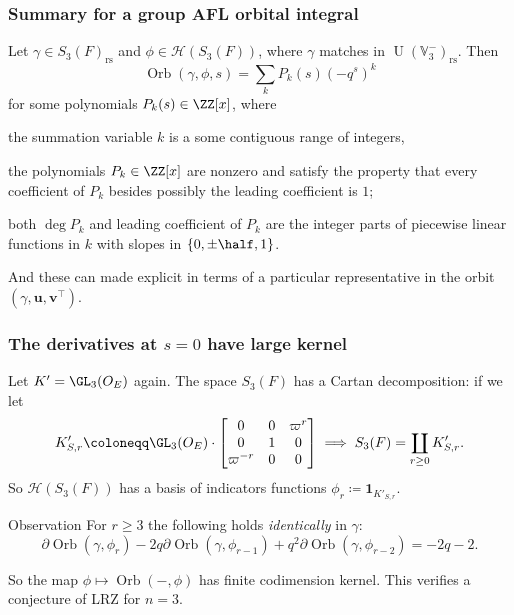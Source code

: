 \documentclass[11pt]{beamer}
\DeclareMathOperator{\Orb}{Orb}
\DeclareMathOperator{\U}{U}
\newcommand{\HH}{\mathcal{H}}
\newcommand{\VV}{\mathbb{V}}
\renewcommand{\OO}{O}
\newcommand{\guv}{{(\gamma, \uu, \vv^\top)}}
\newcommand{\rs}{_{\text{rs}}}
\newcommand{\uu}{\mathbf{u}}
\newcommand{\vv}{\mathbf{v}}
\begin{document}
\begin{frame}
  \frametitle{Summary for a group AFL orbital integral}
  \begin{theorem}[C.]
    Let $\gamma \in S_3(F)\rs$ and $\phi \in \HH(S_3(F))$,
    where $\gamma$ matches in $\U(\VV_3^-)\rs$.
    Then
    \[ \Orb(\gamma, \phi, s) = \sum_k P_k(s) (-q^s)^k \]
    for some polynomials $P_k(s) \in \ZZ[x]$, where
    \begin{itemize}
      \ii the summation variable $k$ is a some contiguous range of integers,

      \ii the polynomials $P_k \in \ZZ[x]$ are nonzero and satisfy the property
      that every coefficient of $P_k$ besides possibly the leading coefficient is $1$;

      \ii both $\deg P_k$ and leading coefficient of $P_k$ are the integer parts
      of piecewise linear functions in $k$ with slopes in $\{0, \pm\half, 1\}$.
    \end{itemize}
    And these can made explicit in terms of a particular representative in the orbit $\guv$.
  \end{theorem}
\end{frame}

\begin{frame}
  \frametitle{The derivatives at $s = 0$ have large kernel}
  \begin{itemize}
    \ii Let $K' = \GL_3(\OO_E)$ again.
    \ii The space $S_3(F)$ has a \alert{Cartan decomposition}: if we let
    \[ K'_{S,r} \coloneqq \GL_3(\OO_E) \cdot \begin{bmatrix} 0 & 0 & \varpi^r \\ 0 & 1 & 0 \\ \varpi^{-r} & 0 & 0 \end{bmatrix}
      \implies S_3(F) = \coprod_{r \geq 0} K'_{S,r}. \]
    \ii So $\HH(S_3(F))$ has a basis of indicators functions $\phi_r \coloneqq \mathbf{1}_{K'_{S, r}}. $
  \end{itemize}
  \begin{exampleblock}{Observation}
    For $r \ge 3$ the following holds \emph{identically} in $\gamma$:
    \[ \partial \Orb(\gamma, \phi_r)
      - 2q \partial \Orb(\gamma, \phi_{r-1})
      + q^2 \partial \Orb(\gamma, \phi_{r-2}) = -2q-2. \]
  \end{exampleblock}
  So the map $\phi \mapsto \Orb(-, \phi)$ has finite codimension kernel.
  This verifies a conjecture of LRZ for $n = 3$.
\end{frame}
\end{document}
